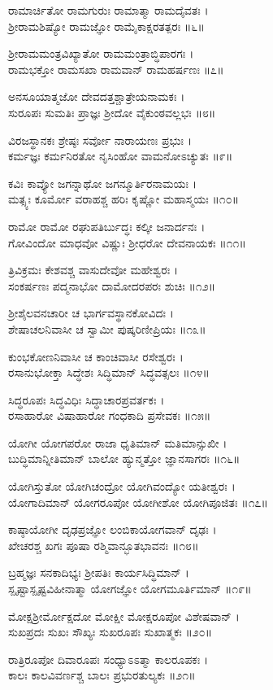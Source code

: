 ರಾಮಾರ್ಚಿತೋ ರಾಮಗುರುಃ ರಾಮಾತ್ಮಾ ರಾಮದೈವತಃ ।\\
ಶ್ರೀರಾಮಶಿಷ್ಯೋ ರಾಮಜ್ಞೋ ರಾಮೈಕಾಕ್ಷರತತ್ಪರಃ ॥೬॥

ಶ್ರೀರಾಮಮಂತ್ರವಿಖ್ಯಾತೋ ರಾಮಮಂತ್ರಾಬ್ಧಿಪಾರಗಃ ।\\
ರಾಮಭಕ್ತೋ ರಾಮಸಖಾ ರಾಮವಾನ್ ರಾಮಹರ್ಷಣಃ ॥೭॥

ಅನಸೂಯಾತ್ಮಜೋ ದೇವದತ್ತಶ್ಚಾತ್ರೇಯನಾಮಕಃ ।\\
ಸುರೂಪಃ ಸುಮತಿಃ ಪ್ರಾಜ್ಞಃ ಶ್ರೀದೋ ವೈಕುಂಠವಲ್ಲಭಃ ॥೮॥

ವಿರಜಸ್ಥಾನಕಃ ಶ್ರೇಷ್ಠಃ ಸರ್ವೋ ನಾರಾಯಣಃ ಪ್ರಭುಃ ।\\
ಕರ್ಮಜ್ಞಃ ಕರ್ಮನಿರತೋ ನೃಸಿಂಹೋ ವಾಮನೋಽಚ್ಯುತಃ ॥೯॥

ಕವಿಃ ಕಾವ್ಯೋ ಜಗನ್ನಾಥೋ ಜಗನ್ಮೂರ್ತಿರನಾಮಯಃ ।\\
ಮತ್ಸ್ಯಃ ಕೂರ್ಮೋ ವರಾಹಶ್ಚ ಹರಿಃ ಕೃಷ್ಣೋ ಮಹಾಸ್ಮಯಃ ॥೧೦॥

ರಾಮೋ ರಾಮೋ ರಘುಪತಿರ್ಬುದ್ಧಃ ಕಲ್ಕೀ ಜನಾರ್ದನಃ ।\\
ಗೋವಿಂದೋ ಮಾಧವೋ ವಿಷ್ಣುಃ ಶ್ರೀಧರೋ ದೇವನಾಯಕಃ ॥೧೧॥

ತ್ರಿವಿಕ್ರಮಃ ಕೇಶವಶ್ಚ ವಾಸುದೇವೋ ಮಹೇಶ್ವರಃ ।\\
ಸಂಕರ್ಷಣಃ ಪದ್ಮನಾಭೋ ದಾಮೋದರಪರಃ ಶುಚಿಃ ॥೧೨॥

ಶ್ರೀಶೈಲವನಚಾರೀ ಚ ಭಾರ್ಗವಸ್ಥಾನಕೋವಿದಃ ।\\
ಶೇಷಾಚಲನಿವಾಸೀ ಚ ಸ್ವಾಮೀ ಪುಷ್ಕರಿಣೀಪ್ರಿಯಃ ॥೧೩॥

ಕುಂಭಕೋಣನಿವಾಸೀ ಚ ಕಾಂಚಿವಾಸೀ ರಸೇಶ್ವರಃ ।\\
ರಸಾನುಭೋಕ್ತಾ ಸಿದ್ಧೇಶಃ ಸಿದ್ಧಿಮಾನ್ ಸಿದ್ಧವತ್ಸಲಃ ॥೧೪॥

ಸಿದ್ಧರೂಪಃ ಸಿದ್ಧವಿಧಿಃ ಸಿದ್ಧಾಚಾರಪ್ರವರ್ತಕಃ ।\\
ರಸಾಹಾರೋ ವಿಷಾಹಾರೋ ಗಂಧಕಾದಿ ಪ್ರಸೇವಕಃ ॥೧೫॥

ಯೋಗೀ ಯೋಗಪರೋ ರಾಜಾ ಧೃತಿಮಾನ್ ಮತಿಮಾನ್ಸುಖೀ ।\\
ಬುದ್ಧಿಮಾನ್ನೀತಿಮಾನ್ ಬಾಲೋ ಹ್ಯುನ್ಮತ್ತೋ ಜ್ಞಾನಸಾಗರಃ ॥೧೬॥

ಯೋಗಿಸ್ತುತೋ ಯೋಗಿಚಂದ್ರೋ ಯೋಗಿವಂದ್ಯೋ ಯತೀಶ್ವರಃ ।\\
ಯೋಗಾದಿಮಾನ್ ಯೋಗರೂಪೋ ಯೋಗೀಶೋ ಯೋಗಿಪೂಜಿತಃ ॥೧೭॥

ಕಾಷ್ಠಾಯೋಗೀ ದೃಢಪ್ರಜ್ಞೋ ಲಂಬಿಕಾಯೋಗವಾನ್ ದೃಢಃ ।\\
ಖೇಚರಶ್ಚ ಖಗಃ ಪೂಷಾ ರಶ್ಮಿವಾನ್ಭೂತಭಾವನಃ ॥೧೮॥

ಬ್ರಹ್ಮಜ್ಞಃ ಸನಕಾದಿಭ್ಯಃ ಶ್ರೀಪತಿಃ ಕಾರ್ಯಸಿದ್ಧಿಮಾನ್ ।\\
ಸ್ಪೃಷ್ಟಾಸ್ಪೃಷ್ಟವಿಹೀನಾತ್ಮಾ ಯೋಗಜ್ಞೋ ಯೋಗಮೂರ್ತಿಮಾನ್ ॥೧೯॥

ಮೋಕ್ಷಶ್ರೀರ್ಮೋಕ್ಷದೋ ಮೋಕ್ಷೀ ಮೋಕ್ಷರೂಪೋ ವಿಶೇಷವಾನ್ ।\\
ಸುಖಪ್ರದಃ ಸುಖಃ ಸೌಖ್ಯಃ ಸುಖರೂಪಃ ಸುಖಾತ್ಮಕಃ ॥೨೦॥

ರಾತ್ರಿರೂಪೋ ದಿವಾರೂಪಃ ಸಂಧ್ಯಾಽಽತ್ಮಾ ಕಾಲರೂಪಕಃ ।\\
ಕಾಲಃ ಕಾಲವಿವರ್ಣಶ್ಚ ಬಾಲಃ ಪ್ರಭುರತುಲ್ಯಕಃ ॥೨೧॥

